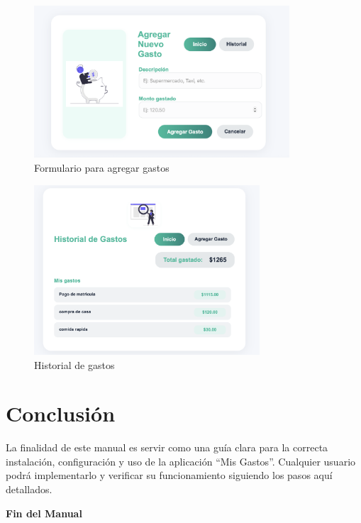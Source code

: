 \documentclass[12pt,a4paper]{article}
\begin{document}
\begin{figure}[H]
    \centering
    \includegraphics[width=0.85\textwidth]{Formulario.png}
    \caption{Formulario para agregar gastos}
\end{figure}    

\begin{figure}[H]
    \centering
    \includegraphics[width=0.75\textwidth]{Historial de gastos.png}
    \caption{Historial de gastos}
\end{figure}
    
\section{Conclusión}

La finalidad de este manual es servir como una guía clara para la correcta instalación, configuración y uso de la aplicación “Mis Gastos”. Cualquier usuario podrá implementarlo y verificar su funcionamiento siguiendo los pasos aquí detallados.

\vfill
\begin{center}
    \textbf{ Fin del Manual }
\end{center}
\end{document}
